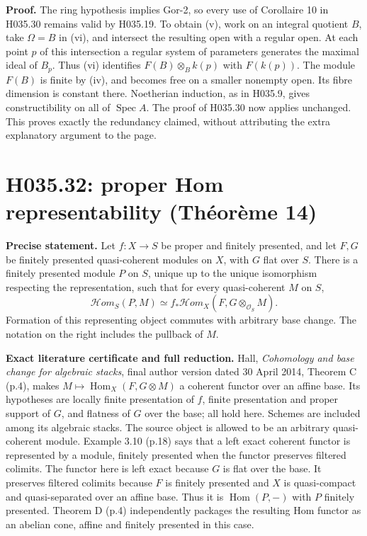 \textbf{Proof.} The ring hypothesis implies Gor-2, so every use of
Corollaire 10 in H035.30 remains valid by H035.19. To obtain (v),
work on an integral quotient $B$, take $\Omega=B$ in (vi), and
intersect the resulting open with a regular open. At each point $p$
of this intersection a regular system of parameters generates the
maximal ideal of $B_p$. Thus (vi) identifies
$F(B)\otimes_B k(p)$ with $F(k(p))$. The module $F(B)$ is finite
by (iv), and becomes free on a smaller nonempty open. Its fibre
dimension is constant there. Noetherian induction, as in H035.9,
gives constructibility on all of $\operatorname{Spec}A$. The proof
of H035.30 now applies unchanged. This proves exactly the redundancy
claimed, without attributing the extra explanatory argument to the page.

\section{H035.32: proper Hom representability (Théorème 14)}
\textbf{Precise statement.} Let $f:X\to S$ be proper and finitely
presented, and let $F,G$ be finitely presented quasi-coherent modules
on $X$, with $G$ flat over $S$. There is a finitely presented module
$P$ on $S$, unique up to the unique isomorphism respecting the
representation, such that for every quasi-coherent $M$ on $S$,
\[
 \mathcal Hom_S(P,M)\simeq
 f_*\mathcal Hom_X(F,G\otimes_{\mathcal O_S}M).
\]
Formation of this representing object commutes with arbitrary base
change. The notation on the right includes the pullback of $M$.

\textbf{Exact literature certificate and full reduction.} Hall,
\emph{Cohomology and base change for algebraic stacks}, final author
version dated 30 April 2014, Theorem C (p.4), makes
$M\mapsto\operatorname{Hom}_X(F,G\otimes M)$ a coherent functor
over an affine base. Its hypotheses are locally finite presentation of
$f$, finite presentation and proper support of $G$, and flatness of
$G$ over the base; all hold here. Schemes are included among its
algebraic stacks. The source object is allowed to be an arbitrary
quasi-coherent module. Example 3.10 (p.18) says that a left exact
coherent functor is represented by a module, finitely presented when
the functor preserves filtered colimits. The functor here is left
exact because $G$ is flat over the base. It preserves filtered
colimits because $F$ is finitely presented and $X$ is quasi-compact
and quasi-separated over an affine base. Thus it is $\operatorname{Hom}(P,-)$
with $P$ finitely presented. Theorem D (p.4) independently packages
the resulting Hom functor as an abelian cone, affine and finitely
presented in this case.

